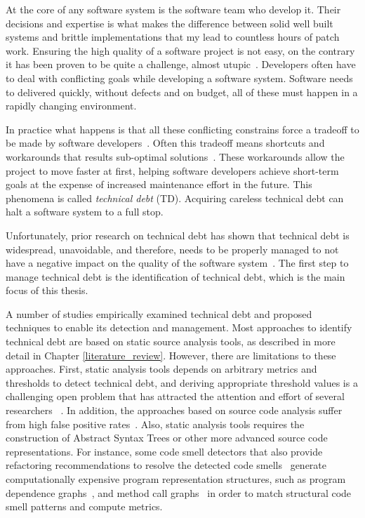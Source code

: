 
At the core of any software system is the software team who develop it. Their decisions and expertise is what makes the difference between solid well built systems and brittle implementations that my lead to countless hours of patch work. Ensuring the high quality of a software project is not easy, on the contrary it has been proven to be quite a challenge, almost utupic~\cite{kruchten2012IEEE}. Developers often have to deal with conflicting goals while developing a software system. Software needs to delivered quickly, without defects and on budget, all of these must happen in a rapidly changing environment.

In practice what happens is that all these conflicting constrains force a tradeoff to be made by software developers~\cite{Cunningham1992WPM}. Often this tradeoff means shortcuts and workarounds that results sub-optimal solutions~\cite{Seaman2011,Kruchten2013IWMTD}. These workarounds allow the project to move faster at first, helping software developers achieve short-term goals at the expense of increased maintenance effort in the future. This phenomena is called \emph{technical debt} (TD). Acquiring careless technical debt can halt a software system to a full stop.

Unfortunately, prior research on technical debt has shown that technical debt is widespread, unavoidable, and therefore, needs to be properly managed to not have a negative impact on the quality of the software system~\cite{Lim2012Software}. The first step to manage technical debt is the identification of technical debt, which is the main focus of this thesis. 

A number of studies empirically examined technical debt and proposed techniques to enable its detection and management. Most approaches to identify technical debt are based on static source analysis tools, as described in more detail in Chapter \ref{literature_review}. However, there are limitations to these approaches. First, static analysis tools depends on arbitrary metrics and thresholds to detect technical debt, and deriving appropriate threshold values is a challenging open problem that has attracted the attention and effort of several researchers ~\cite{Oliveira2014CSMR,Fontana2015WETSoM,Fontana2015EMSE}. In addition, the approaches based on source code analysis suffer from high false positive rates~\cite{Fontana2016SANER}. Also, static analysis tools requires the construction of Abstract Syntax Trees or other more advanced source code representations. For instance, some code smell detectors that also provide refactoring recommendations to resolve the detected code smells~\cite{Tsantalis2011TSE,Tsantalis2015TSE} generate computationally expensive program representation structures, such as program dependence graphs~\cite{Graf2010SCAM}, and method call graphs~\cite{Ali2012ECOOP} in order to match structural code smell patterns and compute metrics.

